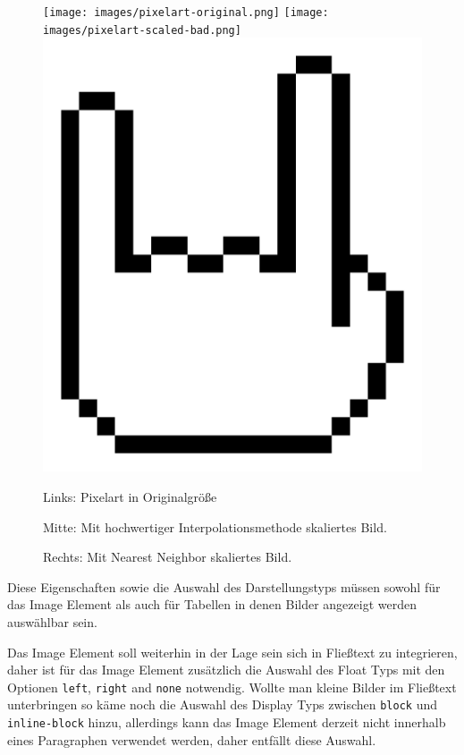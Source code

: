 \begin{figure}
  \texttt{[image: images/pixelart-original.png]}
  \texttt{[image: images/pixelart-scaled-bad.png]}
  \includegraphics[width=\columnwidth/100*46]{images/pixelart-scaled-good.png}

  Links: Pixelart in Originalgröße

  Mitte: Mit hochwertiger Interpolationsmethode skaliertes Bild.

  Rechts: Mit Nearest Neighbor skaliertes Bild.
\end{figure}

Diese Eigenschaften sowie die Auswahl des Darstellungstyps müssen sowohl für das
Image Element als auch für Tabellen in denen Bilder angezeigt werden auswählbar
sein.

Das Image Element soll weiterhin in der Lage sein sich in Fließtext zu
integrieren, daher ist für das Image Element zusätzlich die Auswahl des Float
Typs mit den Optionen \texttt{left}, \texttt{right} and \texttt{none} notwendig.
Wollte man kleine Bilder im Fließtext unterbringen so käme noch die Auswahl des
Display Typs zwischen \texttt{block} und \texttt{inline-block} hinzu, allerdings
kann das Image Element derzeit nicht innerhalb eines Paragraphen verwendet
werden, daher entfällt diese Auswahl.

